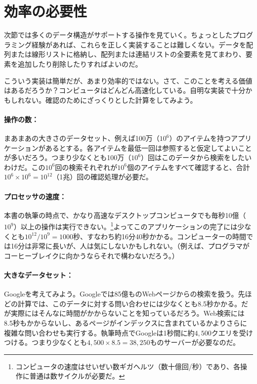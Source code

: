 \section{効率の必要性}

次節では多くのデータ構造がサポートする操作を見ていく。ちょっとしたプログラミング経験があれば、これらを正しく実装することは難しくない。データを配列または線形リストに格納し、配列または連結リストの全要素を見てまわり、要素を追加したり削除したりすればよいのだ。

こういう実装は簡単だが、あまり効率的ではない。さて、このことを考える価値はあるだろうか？コンピュータはどんどん高速化している。自明な実装で十分かもしれない。確認のためにざっくりとした計算をしてみよう。

\paragraph{操作の数：}
まあまあの大きさのデータセット、例えば100万（$10^6$）のアイテムを持つアプリケーションがあるとする。各アイテムを最低一回は参照すると仮定してよいことが多いだろう。つまり少なくとも100万（$10^6$）回はこのデータから検索をしたいわけだ。この$10^6$回の検索それぞれが$10^6$個のアイテムをすべて確認すると、合計$10^6\times 10^6=10^{12}$（1兆）回の確認処理が必要だ。

\paragraph{プロセッサの速度：}
本書の執筆の時点で、かなり高速なデスクトップコンピュータでも毎秒10億（$10^9$）以上の操作は実行できない。\footnote{コンピュータの速度はせいぜい数ギガヘルツ（数十億回/秒）であり、各操作に普通は数サイクルが必要だ。}よってこのアプリケーションの完了には少なくとも$10^{12}/10^9=1000$秒、すなわち約16分40秒かかる。コンピューターの時間では16分は非常に長いが、人は気にしないかもしれない。（例えば、プログラマがコーヒーブレイクに向かうならそれで構わないだろう。）

\paragraph{大きなデータセット：}
Googleを考えてみよう。Googleでは85億ものWebページからの検索を扱う。先ほどの計算では、このデータに対する問い合わせには少なくとも8.5秒かかる。だが実際にはそんなに時間がかからないことを知っているだろう。Web検索には8.5秒もかからないし、あるページがインデックスに含まれているかよりさらに複雑な問い合わせも実行する。執筆時点でGoogleは1秒間に約$4,500$クエリを受けつける。つまり少なくとも$4,500 \times 8.5 = 38,250$ものサーバーが必要なのだ。


